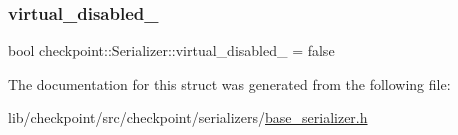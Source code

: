\mbox{\label{structcheckpoint_1_1_serializer_a46ef3c0da77d80853882a7cad641c2af}} 
\subsubsection{\texorpdfstring{virtual\+\_\+disabled\+\_\+}{virtual\_disabled\_}}
{\footnotesize\ttfamily bool checkpoint\+::\+Serializer\+::virtual\+\_\+disabled\+\_\+ = false\hspace{0.3cm}{\ttfamily [protected]}}



The documentation for this struct was generated from the following file\+:\begin{DoxyCompactItemize}
\item 
lib/checkpoint/src/checkpoint/serializers/\hyperlink{base__serializer_8h}{base\+\_\+serializer.\+h}\end{DoxyCompactItemize}

